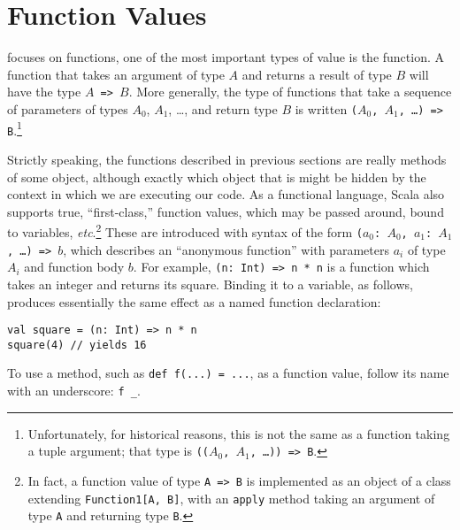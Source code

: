 \section{Function Values}\label{sec:fval}
 focuses on functions, one of the most important types of value is the function. A function that takes an argument of type $A$ and returns a result of type $B$ will have the type \texttt{$A$ => $B$}. More generally, the type of functions that take a sequence of parameters of types $A_0$, $A_1$, \ldots, and return type $B$ is written \texttt{($A_0$, $A_1$, \ldots)\ => B}.\footnote{Unfortunately, for historical reasons, this is not the same as a function taking a tuple argument; that type is \texttt{(($A_0$, $A_1$, \ldots))\ => B}.}

Strictly speaking, the functions described in previous sections are really methods of some object, although exactly which object that is might be hidden by the context in which we are executing our code. As a functional language, Scala also supports true, ``first-class,'' function values, which may be passed around, bound to variables, \textit{etc}.\footnote{In fact, a function value of type \texttt{A => B} is implemented as an object of a class extending \texttt{Function1[A, B]}, with an \texttt{apply} method taking an argument of type \texttt{A} and returning type \texttt{B}.} These are introduced with syntax of the form \texttt{($a_0$:\ $A_0$, $a_1$:\ $A_1$, \ldots)\ => $b$}, which describes an ``anonymous function'' with parameters $a_i$ of type $A_i$ and function body $b$. For example, \texttt{(n:\ Int)\ => n * n} is a function which takes an integer and returns its square. Binding it to a variable, as follows, produces essentially the same effect as a named function declaration:
\begin{verbatim}
val square = (n: Int) => n * n
square(4) // yields 16
\end{verbatim}
To use a method, such as \verb|def f(...) = ...|, as a function value, follow its name with an underscore: \verb|f _|.

